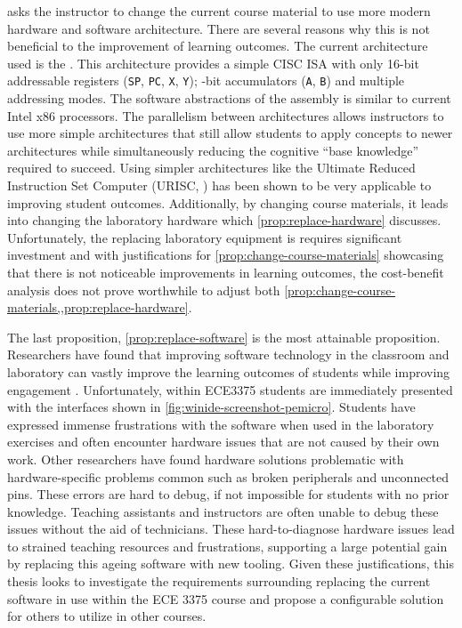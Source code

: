  asks the instructor to change the current course material to use more modern hardware and software architecture. There are several reasons why this is not beneficial to the improvement of learning outcomes. The current architecture used is the \hcmodel{}. This architecture provides a simple CISC ISA with only  16-bit addressable registers (\verb|SP|, \verb|PC|, \verb|X|, \verb|Y|);  -bit accumulators (\verb|A|, \verb|B|) and multiple addressing modes\cite{hc12Manual2006}. The software abstractions of the \hcmodel{} assembly is similar to current Intel\textregistered{} x86 processors\cite{intel2017}. The parallelism between architectures allows instructors to use more simple architectures that still allow students to apply concepts to newer architectures while simultaneously reducing the cognitive ``base knowledge'' required to succeed. Using simpler architectures like the Ultimate Reduced Instruction Set Computer (URISC, \cite{mavaddat1988}) has been shown to be very applicable to improving student outcomes\cite{Nakamura2013, McLoughlin2010, Mavaddat1988}. Additionally, by changing course materials, it leads into changing the laboratory hardware which \cref{prop:replace-hardware} discusses. Unfortunately, the replacing laboratory equipment is requires significant investment and with justifications for \cref{prop:change-course-materials} showcasing that there is not noticeable improvements in learning outcomes, the cost-benefit analysis does not prove worthwhile to adjust both \cref{prop:change-course-materials,,prop:replace-hardware}.

The last proposition, \cref{prop:replace-software} is the most attainable proposition. Researchers have found that improving software technology in the classroom and laboratory can vastly improve the learning outcomes of students while improving engagement \cite{Ackovska2014, Stolikj2011, Ristov2011, Ristov2014, Nikolic2009, Skillen2011, Tappan2009, Djordjevic2005, cec2016}. Unfortunately, within ECE3375 students are immediately presented with the interfaces shown in \cref{fig:winide-screenshot-pemicro}. Students have expressed immense frustrations with the software when used in the laboratory exercises and often encounter hardware issues that are not caused by their own work\cite{evals:ece3375-2013, evals:ece3375-2014}. Other researchers have found hardware solutions problematic with hardware-specific problems common such as broken peripherals and unconnected pins\cite{Ackovska2014}. These errors are hard to debug, if not impossible for students with no prior knowledge. Teaching assistants and instructors are often unable to debug these issues without the aid of technicians. These hard-to-diagnose hardware issues lead to strained teaching resources and frustrations, supporting a large potential gain by replacing this ageing software with new tooling. Given these justifications, this thesis looks to investigate the requirements surrounding replacing the current software in use within the ECE 3375 course and propose a configurable solution for others to utilize in other courses. 

